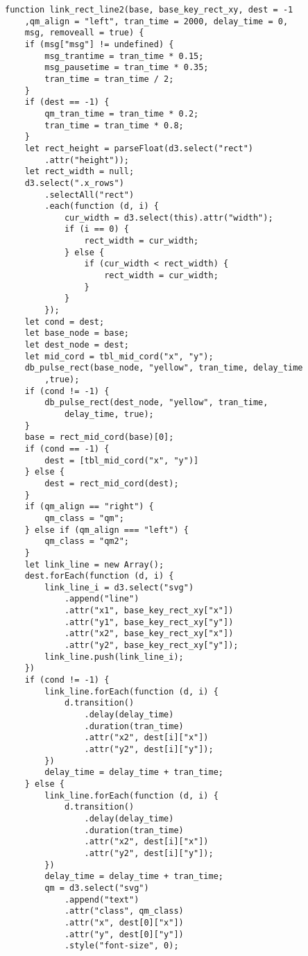 \begin{lstlisting}
function link_rect_line2(base, base_key_rect_xy, dest = -1
    ,qm_align = "left", tran_time = 2000, delay_time = 0,
    msg, removeall = true) {
    if (msg["msg"] != undefined) {
        msg_trantime = tran_time * 0.15;
        msg_pausetime = tran_time * 0.35;
        tran_time = tran_time / 2;
    }
    if (dest == -1) {
        qm_tran_time = tran_time * 0.2;
        tran_time = tran_time * 0.8;
    }
    let rect_height = parseFloat(d3.select("rect")
        .attr("height"));
    let rect_width = null;
    d3.select(".x_rows")
        .selectAll("rect")
        .each(function (d, i) {
            cur_width = d3.select(this).attr("width");
            if (i == 0) {
                rect_width = cur_width;
            } else {
                if (cur_width < rect_width) {
                    rect_width = cur_width;
                }
            }
        });
    let cond = dest;
    let base_node = base;
    let dest_node = dest;
    let mid_cord = tbl_mid_cord("x", "y");
    db_pulse_rect(base_node, "yellow", tran_time, delay_time
        ,true);
    if (cond != -1) {
        db_pulse_rect(dest_node, "yellow", tran_time,
            delay_time, true);
    }
    base = rect_mid_cord(base)[0];
    if (cond == -1) {
        dest = [tbl_mid_cord("x", "y")]
    } else {
        dest = rect_mid_cord(dest);
    }
    if (qm_align == "right") {
        qm_class = "qm";
    } else if (qm_align === "left") {
        qm_class = "qm2";
    }
    let link_line = new Array();
    dest.forEach(function (d, i) {
        link_line_i = d3.select("svg")
            .append("line")
            .attr("x1", base_key_rect_xy["x"])
            .attr("y1", base_key_rect_xy["y"])
            .attr("x2", base_key_rect_xy["x"])
            .attr("y2", base_key_rect_xy["y"]);
        link_line.push(link_line_i);
    })
    if (cond != -1) {
        link_line.forEach(function (d, i) {
            d.transition()
                .delay(delay_time)
                .duration(tran_time)
                .attr("x2", dest[i]["x"])
                .attr("y2", dest[i]["y"]);
        })
        delay_time = delay_time + tran_time;
    } else {
        link_line.forEach(function (d, i) {
            d.transition()
                .delay(delay_time)
                .duration(tran_time)
                .attr("x2", dest[i]["x"])
                .attr("y2", dest[i]["y"]);
        })
        delay_time = delay_time + tran_time;
        qm = d3.select("svg")
            .append("text")
            .attr("class", qm_class)
            .attr("x", dest[0]["x"])
            .attr("y", dest[0]["y"])
            .style("font-size", 0);

\end{lstlisting}
